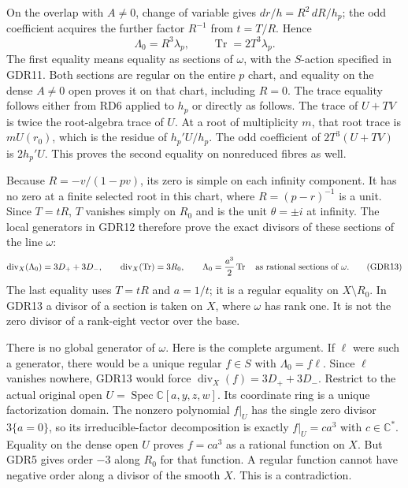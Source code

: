 \documentclass[11pt]{article}
\newcommand{\C}{\mathbb C}
\providecommand{\Spec}{\operatorname{Spec}}
\providecommand{\Tr}{\operatorname{Tr}}
\providecommand{\Div}{\operatorname{div}}
\providecommand{\Tr}{\operatorname{Tr}}
\begin{document}
On the overlap with $A\ne0$, change of variable gives
$dr/h=R^2\,dR/h_p$; the odd coefficient acquires the further
factor $R^{-1}$ from $t=T/R$. Hence
\begin{equation}
 \Lambda_0=R^3\lambda_p,\qquad
 \Tr=2T^3\lambda_p.
 \tag{GDR12}
\end{equation}
The first equality means equality as sections of $\omega$,
with the $S$-action specified in GDR11. Both sections are
regular on the entire $p$ chart, and equality on the dense
$A\ne0$ open proves it on that chart, including $R=0$.
The trace equality follows either from RD6 applied to $h_p$
or directly as follows. The trace of $U+TV$ is twice the
root-algebra trace of $U$. At a root of multiplicity $m$,
that root trace is $mU(r_0)$, which is the residue of
$h_p'U/h_p$. The odd coefficient of $2T^3(U+TV)$ is
$2h_p'U$. This proves the second equality on nonreduced
fibres as well.

Because $R=-v/(1-pv)$, its zero is simple on each infinity
component. It has no zero at a finite selected root in this
chart, where $R=(p-r)^{-1}$ is a unit. Since $T=tR$, $T$
vanishes simply on $R_0$ and is the unit $\theta=\pm i$ at
infinity. The local generators in GDR12 therefore prove
the exact divisors of these sections of the line $\omega$:
\begin{equation}
 \Div_X(\Lambda_0)=3D_++3D_-,\qquad
 \Div_X(\Tr)=3R_0,\qquad
 \Lambda_0=\frac{a^3}{2}\Tr
 \quad\hbox{as rational sections of }\omega.
 \tag{GDR13}
\end{equation}
The last equality uses $T=tR$ and $a=1/t$; it is a regular
equality on $X\setminus R_0$. In GDR13 a divisor of a section
is taken on $X$, where $\omega$ has rank one. It is not the
zero divisor of a rank-eight vector over the base.

There is no global generator of $\omega$. Here is the complete
argument. If $\ell$ were such a generator, there would be a
unique regular $f\in S$ with $\Lambda_0=f\ell$. Since $\ell$
vanishes nowhere, GDR13 would force
$\Div_X(f)=3D_++3D_-$. Restrict to the actual original open
$U=\Spec\C[a,y,z,w]$. Its coordinate ring is a unique
factorization domain. The nonzero polynomial $f|_U$ has the
single zero divisor $3\{a=0\}$, so its irreducible-factor
decomposition is exactly $f|_U=c a^3$ with $c\in\C^*$.
Equality on the dense open $U$ proves $f=c a^3$ as a rational
function on $X$. But GDR5 gives order $-3$ along $R_0$ for
that function. A regular function cannot have negative order
along a divisor of the smooth $X$. This is a contradiction.
\end{document}
